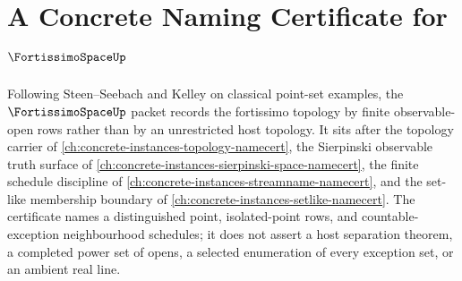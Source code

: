 \chapter{A Concrete Naming Certificate for $\FortissimoSpaceUp$}
\label{ch:concrete-instances-fortissimo-space-namecert}

Following Steen--Seebach and Kelley on classical point-set examples, the $\FortissimoSpaceUp$ packet records the fortissimo topology by finite observable-open rows rather than by an unrestricted host topology. It sits after the topology carrier of \autoref{ch:concrete-instances-topology-namecert}, the Sierpinski observable truth surface of \autoref{ch:concrete-instances-sierpinski-space-namecert}, the finite schedule discipline of \autoref{ch:concrete-instances-streamname-namecert}, and the set-like membership boundary of \autoref{ch:concrete-instances-setlike-namecert}. The certificate names a distinguished point, isolated-point rows, and countable-exception neighbourhood schedules; it does not assert a host separation theorem, a completed power set of opens, a selected enumeration of every exception set, or an ambient real line.

